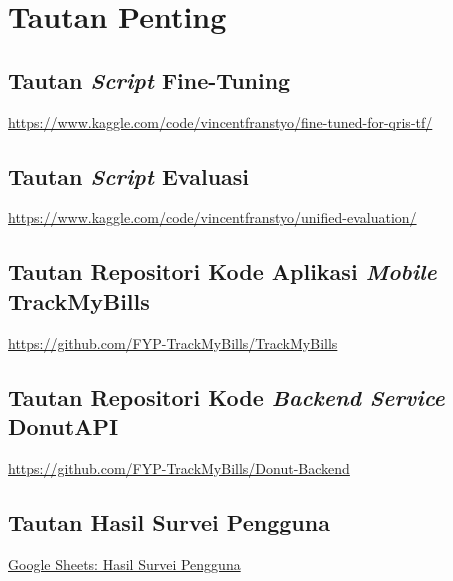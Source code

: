 \chapter{Tautan Penting}
\label{chapter:tautan-penting}

\section{Tautan \emph{Script} Fine-Tuning}
\href{https://www.kaggle.com/code/vincentfranstyo/fine-tuned-for-qris-tf/}{https://www.kaggle.com/code/vincentfranstyo/fine-tuned-for-qris-tf/}

\section{Tautan \emph{Script} Evaluasi}
\href{https://www.kaggle.com/code/vincentfranstyo/unified-evaluation/}
{https://www.kaggle.com/code/vincentfranstyo/unified-evaluation/}

\section{Tautan Repositori Kode Aplikasi \emph{Mobile} TrackMyBills}
\href{https://github.com/FYP-TrackMyBills/TrackMyBills}{https://github.com/FYP-TrackMyBills/TrackMyBills}

\section{Tautan Repositori Kode \emph{Backend Service} DonutAPI}
\href{https://github.com/FYP-TrackMyBills/Donut-Backend}
{https://github.com/FYP-TrackMyBills/Donut-Backend}

\section{Tautan Hasil Survei Pengguna}
\href{https://docs.google.com/spreadsheets/d/1a2Q1Kio0whC7-fwUD3y7AQzv5Cw0PaTOwEdsp9prtck/edit?resourcekey=&gid=529123852#gid=529123852}{Google Sheets: Hasil Survei Pengguna}